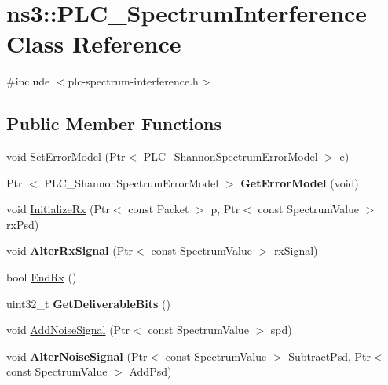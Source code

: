\hypertarget{classns3_1_1PLC__SpectrumInterference}{\section{ns3\-:\-:\-P\-L\-C\-\_\-\-Spectrum\-Interference \-Class \-Reference}
\label{classns3_1_1PLC__SpectrumInterference}
}


{\ttfamily \#include $<$plc-\/spectrum-\/interference.\-h$>$}

\subsection*{\-Public \-Member \-Functions}
\begin{DoxyCompactItemize}
\item 
void \hyperlink{classns3_1_1PLC__SpectrumInterference_ad7f137c6b42e539575c8ceb5cb73edd8}{\-Set\-Error\-Model} (\-Ptr$<$ \-P\-L\-C\-\_\-\-Shannon\-Spectrum\-Error\-Model $>$ e)
\item 
\hypertarget{classns3_1_1PLC__SpectrumInterference_a92a1612a234f5d9e4faa3e8ce7d11fa4}{\-Ptr\*
$<$ \-P\-L\-C\-\_\-\-Shannon\-Spectrum\-Error\-Model $>$ {\bfseries \-Get\-Error\-Model} (void)}\label{classns3_1_1PLC__SpectrumInterference_a92a1612a234f5d9e4faa3e8ce7d11fa4}

\item 
void \hyperlink{classns3_1_1PLC__SpectrumInterference_a8aa4bf9fe22792e67c4c02367edc626c}{\-Initialize\-Rx} (\-Ptr$<$ const \-Packet $>$ p, \-Ptr$<$ const \-Spectrum\-Value $>$ rx\-Psd)
\item 
\hypertarget{classns3_1_1PLC__SpectrumInterference_a28bfb5646b677079e3716df2fc2a7200}{void {\bfseries \-Alter\-Rx\-Signal} (\-Ptr$<$ const \-Spectrum\-Value $>$ rx\-Signal)}\label{classns3_1_1PLC__SpectrumInterference_a28bfb5646b677079e3716df2fc2a7200}

\item 
bool \hyperlink{classns3_1_1PLC__SpectrumInterference_a11dda8387b88020a7244323d991cfbe4}{\-End\-Rx} ()
\item 
\hypertarget{classns3_1_1PLC__SpectrumInterference_ae0ec77fb38725d4328e4b336ad200ea3}{uint32\-\_\-t {\bfseries \-Get\-Deliverable\-Bits} ()}\label{classns3_1_1PLC__SpectrumInterference_ae0ec77fb38725d4328e4b336ad200ea3}

\item 
void \hyperlink{classns3_1_1PLC__SpectrumInterference_ac62fe0cb4f954f2b3ec3050821d6d1a6}{\-Add\-Noise\-Signal} (\-Ptr$<$ const \-Spectrum\-Value $>$ spd)
\item 
\hypertarget{classns3_1_1PLC__SpectrumInterference_a234dd430982bf212771841af9907cd75}{void {\bfseries \-Alter\-Noise\-Signal} (\-Ptr$<$ const \-Spectrum\-Value $>$ \-Subtract\-Psd, \-Ptr$<$ const \-Spectrum\-Value $>$ \-Add\-Psd)}\label{classns3_1_1PLC__SpectrumInterference_a234dd430982bf212771841af9907cd75}


\end{DoxyCompactItemize}
